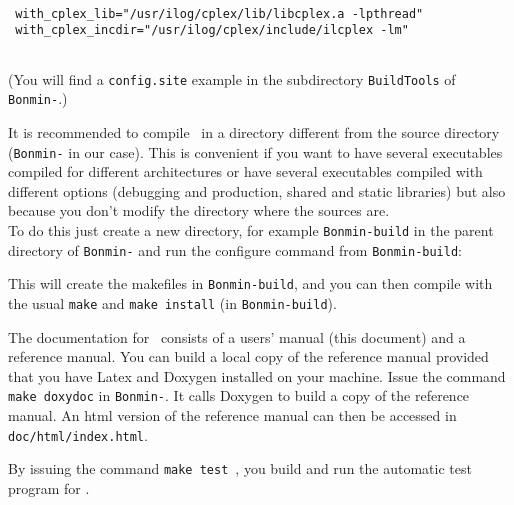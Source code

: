 \begin{colorverb}
 \begin{verbatim}

 with_cplex_lib="/usr/ilog/cplex/lib/libcplex.a -lpthread"
 with_cplex_incdir="/usr/ilog/cplex/include/ilcplex -lm"
 
 \end{verbatim}
\end{colorverb}

 (You will find a {\tt config.site} example in the subdirectory {\tt BuildTools} of {\tt Bonmin-\stableVersion}.)

It is recommended to compile \Bonmin\ in a directory different from the source directory ({\tt Bonmin-\stableVersion} in our case).
This is convenient if you want to have several executables compiled for different architectures or have several executables compiled with different options
(debugging and production, shared and static libraries) but also because
you don't modify the directory where the sources are.\\

To do this just create a new directory, for example {\tt Bonmin-build} in the parent directory of
{\tt Bonmin-\stableVersion} and run the configure command from {\tt Bonmin-build}:

\begin{colorverb}
\end{colorverb}

This will create the makefiles in {\tt Bonmin-build}, and
you can then compile with the usual {\tt make} and {\tt make install}
(in {\tt Bonmin-build}).

The documentation for \Bonmin\ consists of a users' manual (this document) and a reference manual.
You can build a local copy of the reference manual provided that you have Latex
and Doxygen installed on your machine. Issue the command {\tt make
doxydoc} in {\tt Bonmin-\stableVersion}. It calls Doxygen to build a copy of the
reference manual. An html version of the reference manual can then
be accessed in {\tt doc/html/index.html}.


By issuing the command {\tt make test}~, you build and run the automatic test program for \Bonmin.

